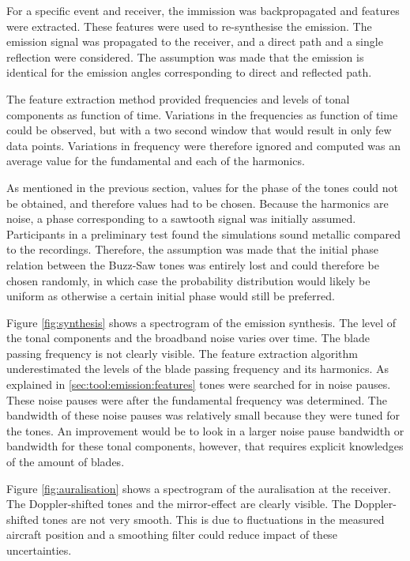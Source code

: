 \documentclass[10pt,twocolumn]{article}
\begin{document}
For a specific event and receiver, the immission was backpropagated and features
were extracted. These features were used to re-synthesise the emission. The
emission signal was propagated to the receiver, and a direct path and a single
reflection were considered. The assumption was made that the emission is
identical for the emission angles corresponding to direct and reflected path.

The feature extraction method provided frequencies and levels of tonal
components as function of time. Variations in the frequencies as function of
time could be observed, but with a two second window that would result in only
few data points. Variations in frequency were therefore ignored and computed was an
average value for the fundamental and each of the harmonics.

As mentioned in the previous section, values for the phase of the tones could
not be obtained, and therefore values had to be chosen. Because the harmonics
are  noise, a phase corresponding to a sawtooth signal was
initially assumed. Participants in a preliminary test found the simulations
sound metallic compared to the recordings.
Therefore, the assumption was made that the initial phase relation between the
Buzz-Saw tones was entirely lost and could therefore be chosen randomly, in
which case the probability distribution would likely be uniform as otherwise a
certain initial phase would still be preferred.

Figure \ref{fig:synthesis} shows a spectrogram of the emission synthesis. The
level of the tonal components and the broadband noise varies over time. The
blade passing frequency is not clearly visible. The feature extraction algorithm
underestimated the levels of the blade passing frequency and its harmonics. As
explained in \ref{sec:tool:emission:features} tones were searched for in noise
pauses. These noise pauses were  after the fundamental frequency
was determined. The bandwidth of these noise pauses was relatively small because
they were tuned for the  tones. An improvement would be to look in
a larger noise pause bandwidth or bandwidth for these tonal components, however,
that requires explicit knowledges of the amount of blades.

Figure \ref{fig:auralisation} shows a spectrogram
of the auralisation at the receiver. The Doppler-shifted tones and the
mirror-effect are clearly visible. The Doppler-shifted tones are not very
smooth. This is due to fluctuations in the measured aircraft position and a smoothing filter
could reduce impact of these uncertainties.
\end{document}
